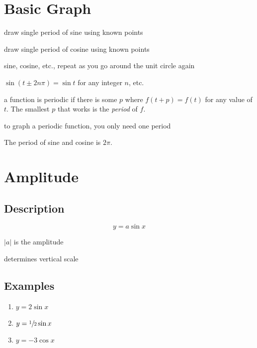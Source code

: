 \documentclass{exam}
\begin{document}
  \section{Basic Graph}
  \begin{itemize*}
    \item draw single period of sine using known points
    \item draw single period of cosine using known points
  \end{itemize*}

  \begin{itemize*}
    \item sine, cosine, etc., repeat as you go around the unit circle again
    \item $\sin(t \pm 2n \pi) = \sin t$ for any integer $n$, etc.
    \item a function is periodic if there is some $p$ where $f(t + p) = f(t)$ for any value of $t$.  The smallest
      $p$ that works is the {\em period} of $f$.
    \item to graph a periodic function, you only need one period
    \item The period of sine and cosine is $2 \pi$.  
  \end{itemize*}

  \section{Amplitude}
  \subsection{Description}
  \[
    y = a \sin x
  \]

  \begin{itemize*}
    \item $|a|$ is the amplitude
    \item determines vertical scale
  \end{itemize*}

  \subsection{Examples}
  \begin{enumerate}
    \item $y = 2 \sin x$
    \item $y = \sfrac{1}{2} \sin x$
    \item $y = -3 \cos x$
  \end{enumerate}
\end{document}

